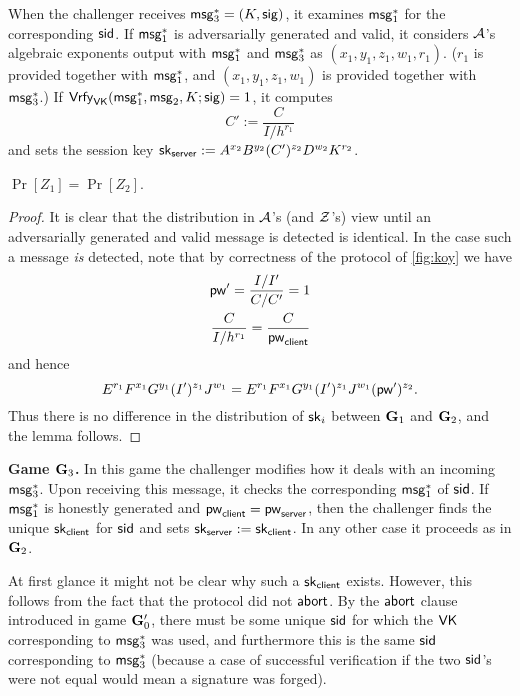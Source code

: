 When the challenger receives $\mathsf{msg}_{3}^{*} = (K,\mathsf{sig})$, it examines $\mathsf{msg}_{1}^{*}$ for the corresponding $\mathsf{sid}$. If $\mathsf{msg}_{1}^{*}$ is adversarially generated and valid, it considers $\mathcal{A}$'s algebraic exponents output with $\mathsf{msg}_{1}^{*}$ and $\mathsf{msg}_{3}^{*}$ as $(x_1,y_1,z_1,w_1,r_1)$. ($r_1$ is provided together with $\mathsf{msg}_{1}^{*}$, and $(x_1,y_1,z_1,w_1)$ is provided together with $\mathsf{msg}_{3}^*$.) If $\mathsf{Vrfy}_{\mathsf{VK}}(\mathsf{msg}_{1}^*,\mathsf{msg}_{2},K;\mathsf{sig})=1$, it computes $$C':= \frac{C}{I/h^{r_1}}$$ and sets the session key $\mathsf{sk}_{\mathsf{server}} := A^{x_2}B^{y_2}(C')^{z_2}D^{w_2}K^{r_2}$.

\begin{lemma}
	$\Pr[Z_1]=\Pr[Z_2]$.
\end{lemma}

\begin{proof}
	It is clear that the distribution in $\mathcal{A}$'s (and $\mathcal{Z}$'s) view until an adversarially generated and valid message is detected is identical. In the case such a message \textit{is} detected, note that by correctness of the protocol of \cref{fig:koy} we have
	\begin{align*}
		\mathsf{pw}'=\frac{I/I'}{C/C'}=1\\
		\frac{C}{I/h^{r_1}} = \frac{C}{\mathsf{pw}_{\mathsf{client}}}
	\end{align*}
	and hence $$E^{r_1}F^{x_1}G^{y_1}(I')^{z_1}J^{w_1} = E^{r_1}F^{x_1}G^{y_1}(I')^{z_1}J^{w_1}(\mathsf{pw}')^{z_2}.$$ Thus there is no difference in the distribution of $\mathsf{sk}_i$ between $\mathbf{G}_1$ and $\mathbf{G}_2$, and the lemma follows.
\end{proof}

\textbf{Game $\mathbf{G}_3$.} In this game the challenger modifies how it deals with an incoming $\mathsf{msg}_{3}^{*}$. Upon receiving this message, it checks the corresponding $\mathsf{msg}_{1}^{*}$ of $\mathsf{sid}$. If $\mathsf{msg}_{1}^{*}$ is honestly generated and $\mathsf{pw}_{\mathsf{client}} = \mathsf{pw}_{\mathsf{server}}$, then the challenger finds the unique $\mathsf{sk}_{\mathsf{client}}$ for $\mathsf{sid}$ and sets $\mathsf{sk}_{\mathsf{server}} := \mathsf{sk}_{\mathsf{client}}$. In any other case it proceeds as in $\mathbf{G}_2$.

At first glance it might not be clear why such a $\mathsf{sk}_{\mathsf{client}}$ exists. However, this follows from the fact that the protocol did not $\mathsf{abort}$. By the $\mathsf{abort}$ clause introduced in game $\mathbf{G}_0'$, there must be some unique $\mathsf{sid}$ for which the $\mathsf{VK}$ corresponding to $\mathsf{msg}_{3}^{*}$ was used, and furthermore this is the same $\mathsf{sid}$ corresponding to $\mathsf{msg}_{3}^{*}$ (because a case of successful verification if the two $\mathsf{sid}$'s were not equal would mean a signature was forged).

